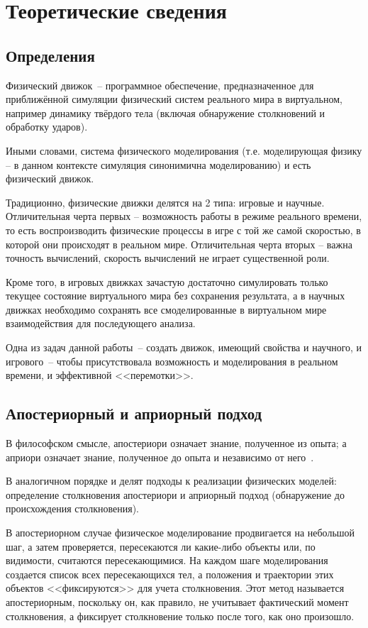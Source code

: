 \chapter{Теоретические сведения}\label{chapter-theory}

\section{Определения}

Физический движок~-- программное обеспечение, предназначенное для приближённой симуляции физический
систем реального мира в виртуальном, например динамику твёрдого тела
(включая обнаружение столкновений и обработку ударов).

Иными словами, система физического моделирования
(т.е. моделирующая физику -- в данном контексте симуляция синонимична моделированию)
и есть физический движок.

Традиционно, физические движки делятся на 2 типа: игровые и научные.
Отличительная черта первых --
возможность работы в режиме реального времени, то есть воспроизводить физические процессы в игре
с той же самой скоростью, в которой они происходят в реальном мире.
Отличительная черта вторых -- важна точность вычислений, скорость вычислений не играет существенной роли.

Кроме того, в игровых движках зачастую достаточно симулировать только текущее состояние виртуального мира без сохранения результата,
а в научных движках необходимо сохранять все смоделированные в виртуальном мире взаимодействия для последующего анализа.

Одна из задач данной работы~-- создать движок, имеющий свойства и научного, и игрового~--
чтобы присутствовала возможность и моделирования в реальном времени, и эффективной <<перемотки>>.

\section{Апостериорный и априорный подход}

В философском смысле, апостериори означает знание, полученное из опыта;
а априори означает знание, полученное до опыта и независимо от него~\cite[с.~105-106]{kant}.

В аналогичном порядке и делят подходы к реализации физических моделей:
определение столкновения апостериори и
априорный подход (обнаружение до происхождения столкновения).

В апостериорном случае физическое моделирование продвигается на небольшой шаг, а затем проверяется,
пересекаются ли какие-либо объекты или, по видимости, считаются пересекающимися. На каждом шаге
моделирования создается список всех пересекающихся тел, а положения и траектории этих объектов <<фиксируются>>
для учета столкновения. Этот метод называется апостериорным, поскольку он, как правило, не учитывает фактический
момент столкновения, а фиксирует столкновение только после того, как оно произошло.

